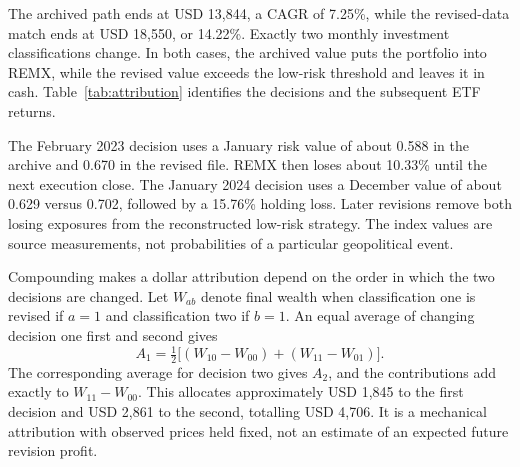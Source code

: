 The archived path ends at USD 13,844, a CAGR of 7.25\%, while the revised-data match ends at USD 18,550, or 14.22\%. Exactly two monthly investment classifications change. In both cases, the archived value puts the portfolio into REMX, while the revised value exceeds the low-risk threshold and leaves it in cash. Table~\ref{tab:attribution} identifies the decisions and the subsequent ETF returns.

\begin{table}[!htbp]
\centering\small
\caption{The two revised classifications and their wealth effects}
\label{tab:attribution}

\end{table}

The February 2023 decision uses a January risk value of about 0.588 in the archive and 0.670 in the revised file. REMX then loses about 10.33\% until the next execution close. The January 2024 decision uses a December value of about 0.629 versus 0.702, followed by a 15.76\% holding loss. Later revisions remove both losing exposures from the reconstructed low-risk strategy. The index values are source measurements, not probabilities of a particular geopolitical event.

Compounding makes a dollar attribution depend on the order in which the two decisions are changed. Let $W_{ab}$ denote final wealth when classification one is revised if $a=1$ and classification two if $b=1$. An equal average of changing decision one first and second gives
\begin{equation}
A_1=\tfrac12\bigl[(W_{10}-W_{00})+(W_{11}-W_{01})\bigr].
\label{eq:attribution}
\end{equation}
The corresponding average for decision two gives $A_2$, and the contributions add exactly to $W_{11}-W_{00}$. This allocates approximately USD 1,845 to the first decision and USD 2,861 to the second, totalling USD 4,706. It is a mechanical attribution with observed prices held fixed, not an estimate of an expected future revision profit.


